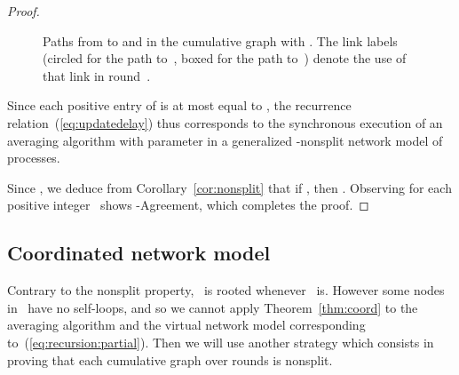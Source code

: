 \documentclass[a4paper]{article}
\theoremstyle{newthm}
\begin{document}
\begin{proof}
\begin{figure}
\caption{Paths from  to  and  in
	the cumulative  graph   with .
The link labels~ (circled for the path to~, boxed for
the path to~)  denote the use of that link in round~.}
\label{fig:ofMatthias}
\end{figure}
	
Since each positive entry of 
	 is at most equal to  ,
	 the recurrence relation~(\ref{eq:updatedelay}) thus corresponds to
	the synchronous execution of an averaging  algorithm with
	parameter  in a generalized
	-nonsplit network model of  processes.

Since , we deduce from Corollary~\ref{cor:nonsplit} that 
	 if   
	,
	then     .
Observing  for each positive integer~ 
	shows -Agreement, which completes the proof.	
\end{proof}

\subsection{Coordinated network model}

Contrary to the nonsplit property,~ is rooted whenever~ is.
However some nodes in~ have no self-loops, and so we cannot apply
	Theorem~\ref{thm:coord} to the averaging algorithm and the virtual network model   corresponding to~(\ref{eq:recursion:partial}).
Then we will use another strategy which consists in proving that  each cumulative graph over  
	rounds is nonsplit. 
	
\end{document}
